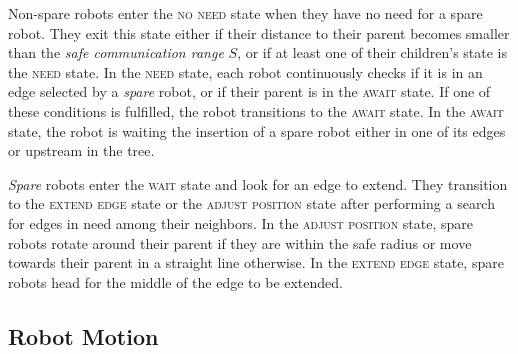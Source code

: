 Non-spare robots enter the \textsc{no need} state when they have no
need for a spare robot. They exit this state either if their distance
to their parent becomes smaller than the \emph{safe communication
  range} $S$, or if at least one of their children's state is the
\textsc{need} state.  In the \textsc{need} state, each robot
continuously checks if it is in an edge selected by a \emph{spare}
robot, or if their parent is in the \textsc{await} state. If one of
these conditions is fulfilled, the robot transitions to the
\textsc{await} state.  In the \textsc{await} state, the robot is
waiting the insertion of a spare robot either in one of its edges or
upstream in the tree.

\emph{Spare} robots enter the \textsc{wait} state and look for an edge
to extend. They transition to the \textsc{extend edge} state or the
\textsc{adjust position} state after performing a search for edges in
need among their neighbors.  In the \textsc{adjust position} state,
spare robots rotate around their parent if they are within the safe
radius or move towards their parent in a straight line otherwise.  In
the \textsc{extend edge} state, spare robots head for the middle of
the edge to be extended.

\subsection{Robot Motion}
\label{sec:robotmotion}

